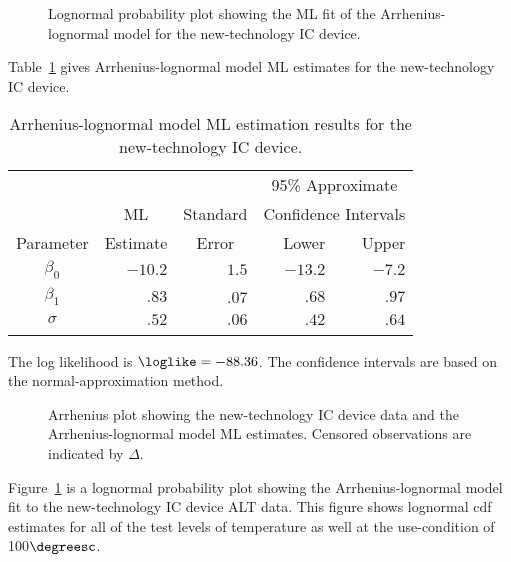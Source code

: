 \begin{example}
\begin{figure}
\caption{Lognormal probability plot showing the ML fit of the 
Arrhenius-lognormal model for the new-technology IC device.}
\label{figure:icdevice02.groupm.lognor.ps}
\end{figure}
Table~\ref{table:icdevice2.lognor.arrhen.mles} gives
Arrhenius-lognormal model ML estimates for the new-technology
IC device.
\begin{table}
\caption{Arrhenius-lognormal model ML 
estimation results for the new-technology IC device.}
\centering\small
\begin{tabular}{crrrr}
\\[-.5ex] \hline
 & & & \multicolumn{2}{c}{95\% Approximate}\\ &\multicolumn{1}{c}{ML}
&Standard & \multicolumn{2}{c}{Confidence Intervals}\\ \cline{4-5} 
Parameter &
Estimate & \multicolumn{1}{c}{Error} & Lower & Upper \\
\hline 
 $\beta_{0}$ & $-10.2$ & $1.5$ & $-13.2$ & $-7.2$ \\[.7ex] 
$\beta_{1}$ & $.83$ & .07 & $.68$ & $.97$ \\[.7ex] 
$\sigma$ & $.52$ & $.06$ & $.42$ & $.64$ \\
\hline
\\[-1.8ex]
\end{tabular}
\begin{minipage}[t]{4in}
The log likelihood is $\loglike= -88.36$. The confidence intervals 
are based on the normal-approximation method.
\end{minipage}
\label{table:icdevice2.lognor.arrhen.mles}
\end{table}
\begin{figure}
\caption{Arrhenius plot showing the new-technology IC device data and 
the Arrhenius-lognormal model ML estimates.
Censored observations are indicated by $\Delta$.}
\label{figure:icdevice02.altplot.lognor.ps}
\end{figure}
Figure~\ref{figure:icdevice02.groupm.lognor.ps} is a lognormal
probability plot showing the Arrhenius-lognormal model fit to the
new-technology IC device ALT data. This figure shows lognormal cdf estimates
for all of the test levels of temperature as well at
the use-condition of 100$\degreesc$.


\end{example}
